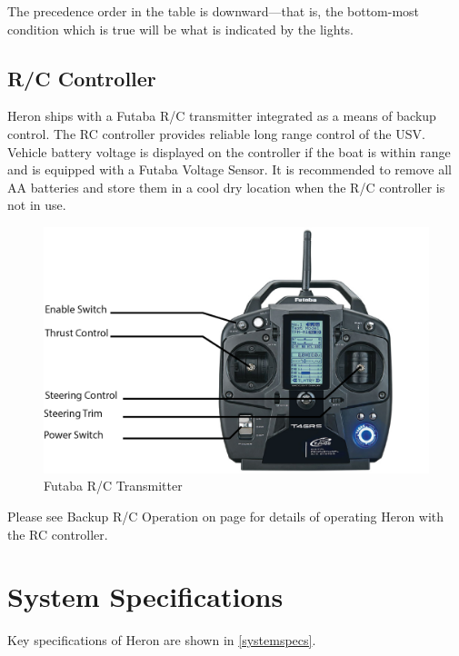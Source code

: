 \documentclass[]{clearpath-latex/clearpath-manual}
\begin{document}
The precedence order in the table is downward—that is, the bottom-most condition which is true will be what is indicated by the lights.

\newpage
\subsection{R/C Controller}
Heron ships with a Futaba R/C transmitter integrated as a means of backup control. The RC controller provides reliable long range control of the USV. Vehicle battery voltage is displayed on the controller if the boat is within range and is equipped with a Futaba Voltage Sensor.  It is recommended to remove all AA batteries and store them in a cool dry location when the R/C controller is not in use.

\begin{figure}[t]
  \centering
  \includegraphics[width=0.85\linewidth]{graphics/h-futaba.PNG}
  \caption{Futaba R/C Transmitter}
  \label{h_futaba}
\end{figure}

Please see Backup R/C Operation on page \pageref{backupoperation} for details of operating Heron with the RC controller.

\newpage


\section{System Specifications}
Key specifications of Heron are shown in \autoref{systemspecs}.
\end{document}
